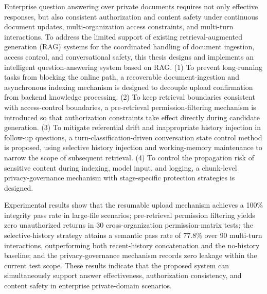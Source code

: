 \begin{abstract*}
  Enterprise question answering over private documents requires not only effective responses, but also consistent authorization and content safety under continuous document updates, multi-organization access constraints, and multi-turn interactions. To address the limited support of existing retrieval-augmented generation (RAG) systems for the coordinated handling of document ingestion, access control, and conversational safety, this thesis designs and implements an intelligent question-answering system based on RAG. (1) To prevent long-running tasks from blocking the online path, a recoverable document-ingestion and asynchronous indexing mechanism is designed to decouple upload confirmation from backend knowledge processing. (2) To keep retrieval boundaries consistent with access-control boundaries, a pre-retrieval permission-filtering mechanism is introduced so that authorization constraints take effect directly during candidate generation. (3) To mitigate referential drift and inappropriate history injection in follow-up questions, a turn-classification-driven conversation state control method is proposed, using selective history injection and working-memory maintenance to narrow the scope of subsequent retrieval. (4) To control the propagation risk of sensitive content during indexing, model input, and logging, a chunk-level privacy-governance mechanism with stage-specific protection strategies is designed.

  Experimental results show that the resumable upload mechanism achieves a 100\% integrity pass rate in large-file scenarios; pre-retrieval permission filtering yields zero unauthorized returns in 30 cross-organization permission-matrix tests; the selective-history strategy attains a semantic pass rate of 77.8\% over 90 multi-turn interactions, outperforming both recent-history concatenation and the no-history baseline; and the privacy-governance mechanism records zero leakage within the current test scope. These results indicate that the proposed system can simultaneously support answer effectiveness, authorization consistency, and content safety in enterprise private-domain scenarios.
\end{abstract*}

